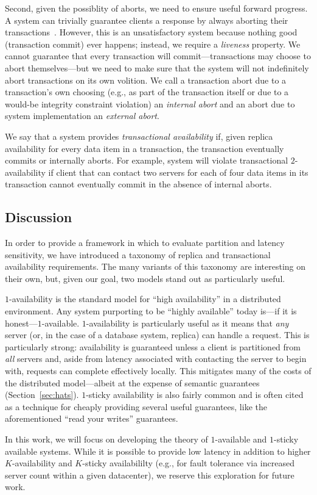 Second, given the possiblity of aborts, we need to ensure useful
forward progress. A system can trivially guarantee clients a response
by always aborting their
transactions~\cite{transaction-liveness}. However, this is an
unsatisfactory system because nothing good (transaction commit) ever
happens; instead, we require a \textit{liveness} property. We cannot
guarantee that every transaction will commit---transactions may choose
to abort themselves---but we need to make sure that the system will
not indefinitely abort transactions on its own volition. We call a
transaction abort due to a transaction's own choosing (e.g., as part
of the transaction itself or due to a would-be integrity constraint
violation) an \textit{internal abort} and an abort due to system
implementation an \textit{external abort}.

We say that a system provides \textit{transactional availability} if,
given replica availability for every data item in a transaction, the
transaction eventually commits or internally aborts. For example,
system will violate transactional $2$-availability if client that can
contact two servers for each of four data items in its transaction
cannot eventually commit in the absence of internal aborts.

\subsection{Discussion}

In order to provide a framework in which to evaluate partition and
latency sensitivity, we have introduced a taxonomy of replica and
transactional availability requirements. The many variants of this
taxonomy are interesting on their own, but, given our goal, two models
stand out as particularly useful.

$1$-availability is the standard model for ``high availability'' in a
distributed environment. Any system purporting to be ``highly
available'' today is---if it is
honest---$1$-available. $1$-availability is particularly useful as it
means that \textit{any} server (or, in the case of a database system,
replica) can handle a request. This is particularly strong:
availability is guaranteed unless a client is partitioned from
\textit{all} servers and, aside from latency associated with
contacting the server to begin with, requests can complete effectively
locally. This mitigates many of the costs of the distributed
model---albeit at the expense of semantic guarantees
(Section~\ref{sec:hats}). $1$-sticky availability is also fairly
common and is often cited as a technique for cheaply providing several
useful guarantees, like the aforementioned ``read your writes''
guarantees.

In this work, we will focus on developing the theory of $1$-available
and $1$-sticky available systems. While it is possible to provide low
latency in addition to higher $K$-availability and $K$-sticky
availabililty (e.g., for fault tolerance via increased server count
within a given datacenter), we reserve this exploration for future work.


